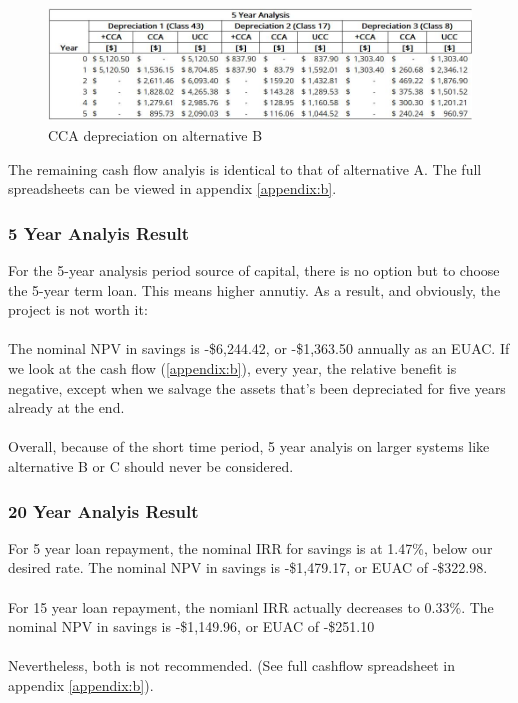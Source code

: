 \documentclass[10pt,letterpaper]{article}
\begin{document}
\begin{figure}[H]
	\centering
	\includegraphics[width=1.0\textwidth]{assets/alternative-b-cca}
	\caption{CCA depreciation on alternative B}
	\label{fig:b-cca}
\end{figure}

The remaining cash flow analyis is identical to that of alternative A. The full spreadsheets can be viewed in appendix \ref{appendix:b}.\\

\subsubsection{5 Year Analyis Result}

For the 5-year analysis period source of capital, there is no option but to choose the 5-year term loan. This means higher annutiy. As a result, and obviously, the project is not worth it:\\
\\
The nominal NPV in savings is -\$6,244.42, or -\$1,363.50 annually as an EUAC. If we look at the cash flow (\ref{appendix:b}), every year, the relative benefit is negative, except when we salvage the assets that's been depreciated for five years already at the end.\\
\\
Overall, because of the short time period, 5 year analyis on larger systems like alternative B or C should never be considered.\\


\subsubsection{20 Year Analyis Result}

For 5 year loan repayment, the nominal IRR for savings is at 1.47\%, below our desired rate. The nominal NPV in savings is -\$1,479.17, or EUAC of -\$322.98.\\
\\
For 15 year loan repayment, the nomianl IRR actually decreases to 0.33\%. The nominal NPV in savings is -\$1,149.96, or EUAC of -\$251.10\\
\\
Nevertheless, both is not recommended. (See full cashflow spreadsheet in appendix \ref{appendix:b}).\\
\end{document}

